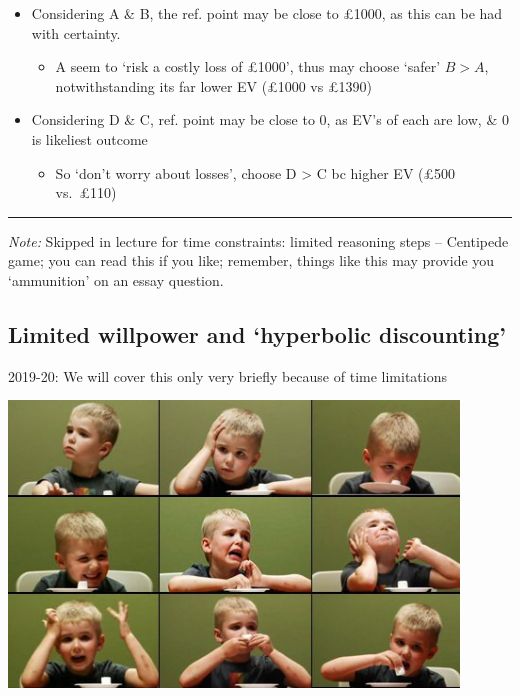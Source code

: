 \documentclass[]{article}
\providecommand{\tightlist}{%
  \setlength{\itemsep}{0pt}\setlength{\parskip}{0pt}}
\begin{document}
\bigskip

\begin{itemize}
\tightlist
\item
  Considering A \& B, the ref. point may be close to \pounds1000, as this can be had with certainty.

  \begin{itemize}
  \tightlist
  \item
    A seem to `risk a costly loss of \pounds1000', thus may choose `safer' \(B>A\), notwithstanding its far lower EV (\pounds1000 vs \pounds1390)
  \end{itemize}
\end{itemize}

\bigskip

\begin{itemize}
\tightlist
\item
  Considering D \& C, ref. point may be close to 0, as EV's of each are low, \& 0 is likeliest outcome

  \begin{itemize}
  \tightlist
  \item
    So `don't worry about losses', choose D \textgreater{} C bc higher EV (\pounds500 vs.~\pounds110)
  \end{itemize}
\end{itemize}

\begin{center}\rule{0.5\linewidth}{\linethickness}\end{center}

\emph{Note:} Skipped in lecture for time constraints: limited reasoning steps -- Centipede game; you can read this if you like; remember, things like this may provide you `ammunition' on an essay question.

\hypertarget{limited-willpower-and-hyperbolic-discounting}{%
\subsection{Limited willpower and `hyperbolic discounting'}\label{limited-willpower-and-hyperbolic-discounting}}

2019-20: We will cover this only very briefly because of time limitations

\includegraphics[height=3in]{picsfigs/marshtest.jpg}
\end{document}
